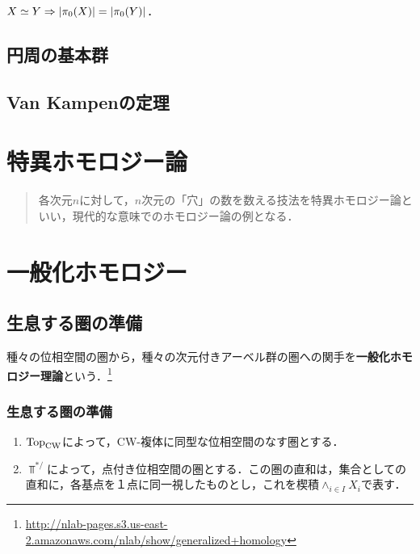 \documentclass[uplatex,dvipdfmx]{jsreport}
\begin{document}
\begin{corollary}[最初のホモトピー不変量]
    $X\simeq Y\Rightarrow\lvert\pi_0(X)\rvert=\lvert\pi_0(Y)\rvert$．
\end{corollary}


\section{円周の基本群}

\section{Van Kampenの定理}

\chapter{特異ホモロジー論}

\begin{quotation}
    各次元$n$に対して，$n$次元の「穴」の数を数える技法を特異ホモロジー論といい，現代的な意味でのホモロジー論の例となる．
\end{quotation}

\chapter{一般化ホモロジー}

\section{生息する圏の準備}

\begin{tcolorbox}[colframe=ForestGreen, colback=ForestGreen!10!white,breakable,colbacktitle=ForestGreen!40!white,coltitle=black,fonttitle=\bfseries\sffamily,
title=]
    種々の位相空間の圏から，種々の次元付きアーベル群の圏への関手を\textbf{一般化ホモロジー理論}という．\footnote{\url{http://nlab-pages.s3.us-east-2.amazonaws.com/nlab/show/generalized+homology}}
\end{tcolorbox}

\subsection{生息する圏の準備}

\begin{notation}\mbox{}
    \begin{enumerate}
        \item $\mathrm{Top}_{\mathrm{CW}}$によって，CW-複体に同型な位相空間のなす圏とする．
        \item $\Top^{*/}$によって，点付き位相空間の圏とする．この圏の直和は，集合としての直和に，各基点を１点に同一視したものとし，これを楔積$\wedge_{i\in I}X_i$で表す．
    \end{enumerate}
\end{notation}
\end{document}
